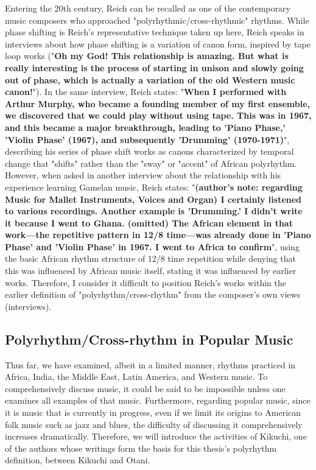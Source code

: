 Entering the 20th century, Reich can be recalled as one of the contemporary music composers who approached "polyrhythmic/cross-rhythmic" rhythms. While phase shifting is Reich's representative technique taken up here, Reich speaks in interviews about how phase shifting is a variation of canon form, inspired by tape loop works ("\textbf{Oh my God! This relationship is amazing. But what is really interesting is the process of starting in unison and slowly going out of phase, which is actually a variation of the old Western music canon!}"\cite{obrist:01}). In the same interview, Reich states: "\textbf{When I performed with Arthur Murphy, who became a founding member of my first ensemble, we discovered that we could play without using tape. This was in 1967, and this became a major breakthrough, leading to 'Piano Phase,' 'Violin Phase' (1967), and subsequently 'Drumming' (1970-1971)}"\cite{obrist:01}, describing his series of phase shift works as canons characterized by temporal change that "shifts" rather than the "sway" or "accent" of African polyrhythm. However, when asked in another interview about the relationship with his experience learning Gamelan music, Reich states: "\textbf{(author's note: regarding Music for Mallet Instruments, Voices and Organ) I certainly listened to various recordings. Another example is 'Drumming.' I didn't write it because I went to Ghana. (omitted) The African element in that work—the repetitive pattern in 12/8 time—was already done in 'Piano Phase' and 'Violin Phase' in 1967. I went to Africa to confirm}"\cite{strickland:01}, using the basic African rhythm structure of 12/8 time repetition while denying that this was influenced by African music itself, stating it was influenced by earlier works. Therefore, I consider it difficult to position Reich's works within the earlier definition of "polyrhythm/cross-rhythm" from the composer's own views (interviews).

\subsection{Polyrhythm/Cross-rhythm in Popular Music}

Thus far, we have examined, albeit in a limited manner, rhythms practiced in Africa, India, the Middle East, Latin America, and Western music. To comprehensively discuss music, it could be said to be impossible unless one examines all examples of that music. Furthermore, regarding popular music, since it is music that is currently in progress, even if we limit its origins to American folk music such as jazz and blues, the difficulty of discussing it comprehensively increases dramatically. Therefore, we will introduce the activities of Kikuchi, one of the authors whose writings form the basis for this thesis's polyrhythm definition, between Kikuchi and Otani.

